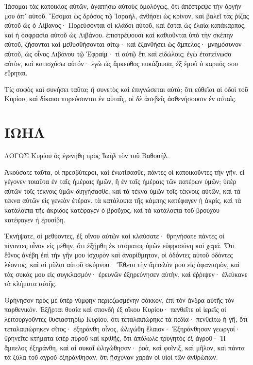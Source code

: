 \begin{spacing}{1.1}
\begin{multicols}{2}
Ἰάσομαι τὰς κατοικίας αὐτῶν, ἀγαπήσω αὐτοὺς ὁμολόγως, ὅτι ἀπέστρεψε τὴν ὀργήν μου ἀπʼ αὐτοῦ.
Ἔσομαι ὡς δρόσος τῷ Ἰσραὴλ, ἀνθήσει ὡς κρίνον, καὶ βαλεῖ τὰς ῥίζας αὐτοῦ ὡς ὁ Λίβανος·
Πορεύσονται οἱ κλάδοι αὐτοῦ, καὶ ἔσται ὡς ἐλαία κατάκαρπος, καὶ ἡ ὀσφρασία αὐτοῦ ὡς Λιβάνου.
ἐπιστρέψουσι καὶ καθιοῦνται ὑπὸ τὴν σκέπην αὐτοῦ, ζήσονται καὶ μεθυσθήσονται σίτῳ· καὶ ἐξανθήσει ὡς ἄμπελος· μνημόσυνον αὐτοῦ, ὡς οἶνος Λιβάνου
τῷ Ἐφραίμ· τί αὐτῷ ἔτι καὶ εἰδώλοις; ἐγὼ ἐταπείνωσα αὐτὸν, καὶ κατισχύσω αὐτόν· ἐγὼ ὡς ἄρκευθος πυκάζουσα, ἐξ ἐμοῦ ὁ καρπός σου εὕρηται.

Τίς σοφὸς καὶ συνήσει ταῦτα; ἢ συνετὸς καὶ ἐπιγνώσεται αὐτά; ὅτι εὐθεῖαι αἱ ὁδοὶ τοῦ Κυρίου, καὶ δίκαιοι πορεύσονται ἐν αὐταῖς, οἱ δὲ ἀσεβεῖς ἀσθενήσουσιν ἐν αὐταῖς.


\end{multicols}
\chapter{ΙΩΗΛ}
\begin{multicols}{2}

ΛΟΓΟΣ Κυρίου ὃς ἐγενήθη πρὸς Ἰωὴλ τὸν τοῦ Βαθουήλ.

Ἀκούσατε ταῦτα, οἱ πρεσβύτεροι, καὶ ἑνωτίσασθε, πάντες οἱ κατοικοῦντες τὴν γῆν. εἰ γέγονεν τοιαῦτα ἐν ταῖς ἡμέραις ἡμῶν, ἢ ἐν ταῖς ἡμέραις τῶν πατέρων ὑμῶν;
ὑπὲρ αὐτῶν τοῖς τέκνοις ὑμῶν διηγήσασθε, καὶ τὰ τέκνα ὑμῶν τοῖς τέκνοις αὐτῶν, καὶ τὰ τέκνα αὐτῶν εἰς γενεὰν ἑτέραν.
τὰ κατάλοιπα τῆς κάμπης κατέφαγεν ἡ ἀκρίς, καὶ τὰ κατάλοιπα τῆς ἀκρίδος κατέφαγεν ὁ βροῦχος, καὶ τὰ κατάλοιπα τοῦ βρούχου κατέφαγεν ἡ ἐρυσίβη.

Ἐκνήψατε, οἱ μεθύοντες, ἐξ οἴνου αὐτῶν καὶ κλαύσατε· θρηνήσατε πάντες οἱ πίνοντες οἶνον εἰς μέθην, ὅτι ἐξῄρθη ἐκ στόματος ὑμῶν εὐφροσύνη καὶ χαρά.
Ὅτι ἔθνος ἀνέβη ἐπὶ τὴν γῆν μου ἰσχυρὸν καὶ ἀναρίθμητον, οἱ ὀδόντες αὐτοῦ ὀδόντες λέοντος, καὶ αἱ μῦλαι αὐτοῦ σκύμνου·
Ἔθετο τὴν ἄμπελόν μου εἰς ἀφανισμὸν, καὶ τὰς συκάς μου εἰς συγκλασμόν· ἐρευνῶν ἐξηρεύνησεν αὐτὴν, καὶ ἔῤῥιψεν· ἐλεύκανε τὰ κλήματα αὐτῆς.

Θρήνησον πρὸς μὲ ὑπὲρ νύμφην περιεζωσμένην σάκκον, ἐπὶ τὸν ἄνδρα αὐτῆς τὸν παρθενικόν.
Ἐξῇρται θυσία καὶ σπονδὴ ἐξ οἴκου Κυρίου· πενθεῖτε οἱ ἱερεῖς οἱ λειτουργοῦντες θυσιαστηρίῳ Κυρίου,
ὅτι τεταλαιπώρηκε τὰ πεδία· πενθείτω ἡ γῆ, ὅτι τεταλαιπώρηκεν σῖτος· ἐξηράνθη οἶνος, ὠλιγώθη ἔλαιον·
Ἐξηράνθησαν γεωργοί· θρηνεῖτε κτήματα ὑπὲρ πυροῦ καὶ κριθῆς, ὅτι ἀπόλωλε τρυγητὸς ἐξ ἀγροῦ·
Ἡ ἄμπελος ἐξηράνθη, καὶ αἱ συκαῖ ὠλιγώθησαν· ῥοὰ, καὶ φοῖνιξ, καὶ μῆλον, καὶ πάντα τὰ ξύλα τοῦ ἀγροῦ ἐξηράνθησαν, ὅτι ᾔσχυναν χαρὰν οἱ υἱοὶ τῶν ἀνθρώπων.


\end{multicols}
\end{spacing}
